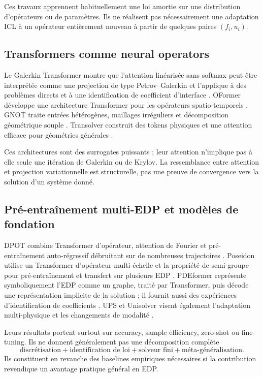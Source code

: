 \documentclass[11pt,a4paper]{article}
\begin{document}
Ces travaux apprennent habituellement une loi amortie sur une distribution
d'opérateurs ou de paramètres. Ils ne réalisent pas nécessairement une
adaptation ICL à un opérateur entièrement nouveau à partir de quelques paires
$(f_i,u_i)$.

\subsection{Transformers comme neural operators}

Le Galerkin Transformer montre que l'attention linéarisée sans softmax peut être
interprétée comme une projection de type Petrov--Galerkin et l'applique à des
problèmes directs et à une identification de coefficient d'interface
\cite{cao2021galerkin}. OFormer développe une architecture Transformer pour les
opérateurs spatio-temporels \cite{li2022oformer}. GNOT traite entrées
hétérogènes, maillages irréguliers et décomposition géométrique souple
\cite{hao2023gnot}. Transolver construit des tokens physiques et une attention
efficace pour géométries générales \cite{wu2024transolver}.

Ces architectures sont des surrogates puissants ; leur attention n'implique pas
à elle seule une itération de Galerkin ou de Krylov. La ressemblance entre
attention et projection variationnelle est structurelle, pas une preuve de
convergence vers la solution d'un système donné.

\subsection{Pré-entraînement multi-EDP et modèles de fondation}

DPOT combine Transformer d'opérateur, attention de Fourier et pré-entraînement
auto-régressif débruitant sur de nombreuses trajectoires
\cite{hao2024dpot}. Poseidon utilise un Transformer d'opérateur multi-échelle
et la propriété de semi-groupe pour pré-entraînement et transfert sur plusieurs
EDP \cite{herde2024poseidon}. PDEformer représente symboliquement l'EDP comme
un graphe, traité par Transformer, puis décode une représentation implicite de
la solution ; il fournit aussi des expériences d'identification de coefficients
\cite{ye2024pdeformer}. UPS et Unisolver visent également l'adaptation
multi-physique et les changements de modalité
\cite{shen2024ups,lu2024unisolver}.

Leurs résultats portent surtout sur accuracy, sample efficiency, zero-shot ou
fine-tuning. Ils ne donnent généralement pas une décomposition complète
\[
  \text{discrétisation} + \text{identification de loi}
  + \text{solveur fini} + \text{méta-généralisation}.
\]
Ils constituent en revanche des baselines empiriques nécessaires si la
contribution revendique un avantage pratique général en EDP.
\end{document}
